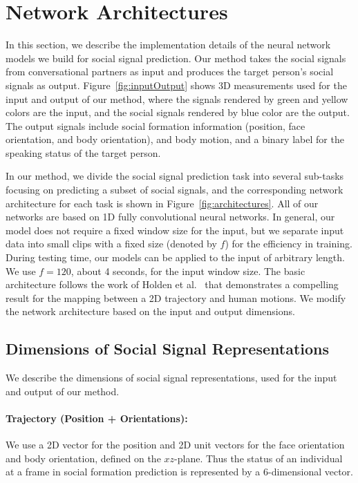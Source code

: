 
\section{Network Architectures}

In this section, we describe the implementation details of the neural network models we build for social signal prediction. Our method takes the social signals from conversational partners as input and produces the target person's social signals as output. Figure~\ref{fig:inputOutput} shows 3D measurements used for the input and output of our method, where the signals rendered by green and yellow colors are the input, and the social signals rendered by blue color are the output. The output signals include social formation information (position, face orientation, and body orientation), and body motion, and a binary label for the speaking status of the target person. 

In our method, we divide the social signal prediction task into several sub-tasks focusing on predicting a subset of social signals, and the corresponding network architecture for each task is shown in Figure~\ref{fig:architectures}. All of our networks are based on 1D fully convolutional neural networks. In general, our model does not require a fixed window size for the input, but we separate input data into small clips with a fixed size (denoted by $f$) for the efficiency in training. During testing time, our models can be applied to the input of arbitrary length. We use $f=120$, about 4 seconds, for the input window size. The basic architecture follows the work of Holden et al.~\cite{holden2016deep} that demonstrates a compelling result for the mapping between a 2D trajectory and human motions. We modify the network architecture based on the input and output dimensions. 

\subsection{Dimensions of Social Signal Representations}
We describe the dimensions of social signal representations, used for the input and output of our method.

\paragraph{Trajectory (Position + Orientations):} We use a 2D vector for the position and 2D unit vectors for the face orientation and body orientation, defined on the $xz$-plane. Thus the status of an individual at a frame in social formation prediction is represented by a 6-dimensional vector.

